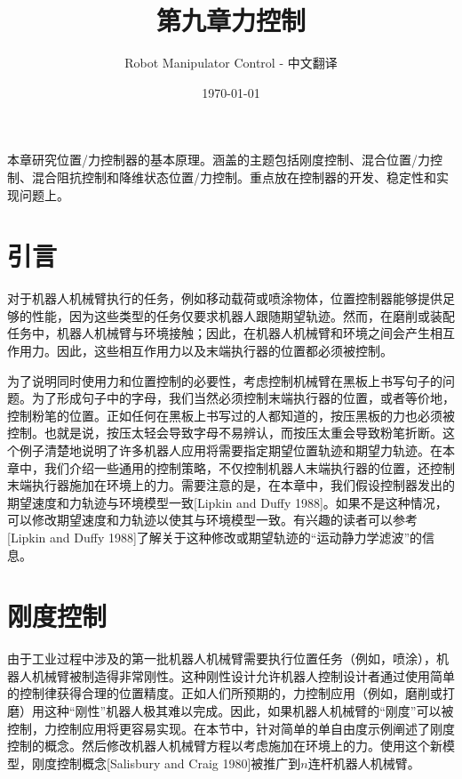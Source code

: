 \documentclass[12pt,a4paper]{ctexart}
\title{第九章\quad 力控制}
\author{Robot Manipulator Control - 中文翻译}
\date{\today}
\begin{document}
  \maketitle
\fi

本章研究位置/力控制器的基本原理。涵盖的主题包括刚度控制、混合位置/力控制、混合阻抗控制和降维状态位置/力控制。重点放在控制器的开发、稳定性和实现问题上。

\section{引言}\label{sec:9.1}

对于机器人机械臂执行的任务，例如移动载荷或喷涂物体，位置控制器能够提供足够的性能，因为这些类型的任务仅要求机器人跟随期望轨迹。然而，在磨削或装配任务中，机器人机械臂与环境接触；因此，在机器人机械臂和环境之间会产生相互作用力。因此，这些相互作用力以及末端执行器的位置都必须被控制。

为了说明同时使用力和位置控制的必要性，考虑控制机械臂在黑板上书写句子的问题。为了形成句子中的字母，我们当然必须控制末端执行器的位置，或者等价地，控制粉笔的位置。正如任何在黑板上书写过的人都知道的，按压黑板的力也必须被控制。也就是说，按压太轻会导致字母不易辨认，而按压太重会导致粉笔折断。这个例子清楚地说明了许多机器人应用将需要指定期望位置轨迹和期望力轨迹。在本章中，我们介绍一些通用的控制策略，不仅控制机器人末端执行器的位置，还控制末端执行器施加在环境上的力。需要注意的是，在本章中，我们假设控制器发出的期望速度和力轨迹与环境模型一致[Lipkin and Duffy 1988]。如果不是这种情况，可以修改期望速度和力轨迹以使其与环境模型一致。有兴趣的读者可以参考[Lipkin and Duffy 1988]了解关于这种修改或期望轨迹的``运动静力学滤波''的信息。

\section{刚度控制}\label{sec:9.2}

由于工业过程中涉及的第一批机器人机械臂需要执行位置任务（例如，喷涂），机器人机械臂被制造得非常刚性。这种刚性设计允许机器人控制设计者通过使用简单的控制律获得合理的位置精度。正如人们所预期的，力控制应用（例如，磨削或打磨）用这种``刚性''机器人极其难以完成。因此，如果机器人机械臂的``刚度''可以被控制，力控制应用将更容易实现。在本节中，针对简单的单自由度示例阐述了刚度控制的概念。然后修改机器人机械臂方程以考虑施加在环境上的力。使用这个新模型，刚度控制概念[Salisbury and Craig 1980]被推广到$n$连杆机器人机械臂。
\end{document}
